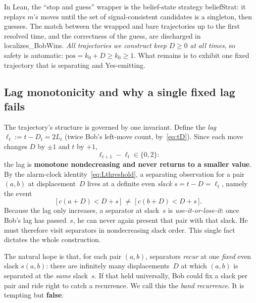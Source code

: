 \documentclass{article}
\newcommand{\us}{\discretionary{}{}{}\_\discretionary{}{}{}}
\newcommand{\lean}[1]{{\small\ttfamily #1}}
\begin{document}
In Lean, the ``stop and guess'' wrapper is the belief-state strategy
\lean{beliefStrat}: it replays $m$'s moves until the set of
signal-consistent candidates is a singleton, then guesses. The match
between the wrapped and bare trajectories up to the first resolved time,
and the correctness of the guess, are discharged in
\lean{localizes\us BobWins}. \emph{All trajectories we construct keep
$D\ge 0$ at all times}, so safety is automatic: $\mathrm{pos} = k_0 + D
\ge k_0 \ge 1$. What remains is to exhibit one fixed trajectory that is
separating and Yes-emitting.

\subsection{Lag monotonicity and why a single fixed lag fails}
\label{sec:lag}

The trajectory's structure is governed by one invariant. Define the
\emph{lag} $\ell_t := t - D_t = 2L_t$ (twice Bob's left-move count,
by~\eqref{eq:tD}). Since each move changes $D$ by $\pm1$ and $t$ by $+1$,
\[
  \ell_{t+1}-\ell_t \in \{0, 2\}:
\]
the lag is \textbf{monotone nondecreasing and never returns to a smaller
value}. By the alarm-clock identity~\eqref{eq:Lthreshold}, a separating
observation for a pair $(a,b)$ at displacement~$D$ lives at a definite
even \emph{slack} $s = t-D = \ell_t$, namely the event
\[
  \bigl[\,c(a+D) < D+s\,\bigr] \;\neq\; \bigl[\,c(b+D) < D+s\,\bigr].
\]
Because the lag only increases, a separator at slack~$s$ is
\emph{use-it-or-lose-it}: once Bob's lag has passed~$s$, he can never
again present that pair with that slack. He must therefore visit
separators in nondecreasing slack order. This single fact dictates the
whole construction.

The natural hope is that, for each pair $(a,b)$, separators \emph{recur}
at one \emph{fixed} even slack $s(a,b)$: there are infinitely many
displacements~$D$ at which $(a,b)$ is separated at the \emph{same}
slack~$s$. If that held universally, Bob could fix a slack per pair and
ride right to catch a recurrence. We call this the \emph{band recurrence}.
It is tempting but \textbf{false}.
\end{document}
